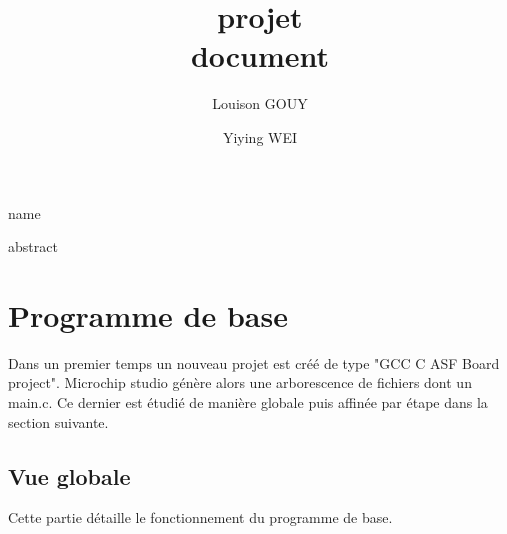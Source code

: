\documentclass[a4paper]{article}
\title{\textbf{projet} \\ document}
\author{Louison GOUY \and Yiying WEI}
\begin{document}
\maketitle

\vspace{2cm}

\begin{center}
\end{center}

\vspace*{1cm}

\begin{center}
    name
\end{center}

\vspace*{7cm}

\begin{center}

abstract

\end{center}
\newpage
\renewcommand{\contentsname}{Table des Matières}
\tableofcontents
\newpage
\renewcommand\listfigurename{Liste des figures}
\listoffigures
\newpage


\section{Programme de base} %

Dans un premier temps un nouveau projet est créé de type "GCC C ASF Board project". Microchip studio génère alors une arborescence de fichiers dont un main.c. Ce dernier est étudié de manière globale puis affinée par étape dans la section suivante.

\subsection{Vue globale}
Cette partie détaille le fonctionnement du programme de base. 
\end{document}
